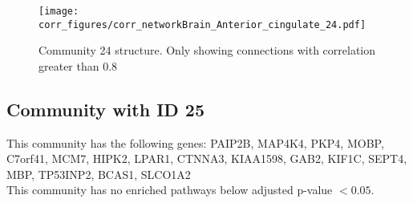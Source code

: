 \begin{figure}[h!]
\centering
\texttt{[image: corr\_figures/corr\_networkBrain\_Anterior\_cingulate\_24.pdf]}
\caption{Community 24 structure. Only showing connections with correlation greater than 0.8}
\end{figure}




\subsection*{Community with ID 25}
This community has the following genes: PAIP2B, MAP4K4, PKP4, MOBP, C7orf41, MCM7, HIPK2, LPAR1, CTNNA3, KIAA1598, GAB2, KIF1C, SEPT4, MBP, TP53INP2, BCAS1, SLCO1A2
\\
This community has no enriched pathways below adjusted p-value $< 0.05$.

